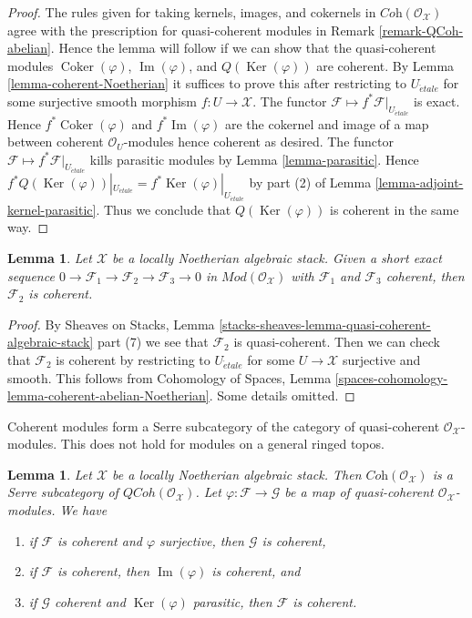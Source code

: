 \documentclass{stacks-project}
\theoremstyle{plain}
\newtheorem{lemma}[subsection]{Lemma}
\theoremstyle{definition}
\theoremstyle{remark}
\numberwithin{equation}{subsection}
\def\etale{{\acute{e}tale}}
\def\QCoh{\mathit{QCoh}}
\def\Ker{\mathop{\mathrm{Ker}}}
\def\Im{\mathop{\mathrm{Im}}}
\def\Coker{\mathop{\mathrm{Coker}}}
\begin{document}
\begin{proof}
The rules given for taking kernels, images, and cokernels in
$\textit{Coh}(\mathcal{O}_\mathcal{X})$ agree with the prescription
for quasi-coherent modules in Remark \ref{remark-QCoh-abelian}.
Hence the lemma will follow if we can show that the quasi-coherent modules
$\Coker(\varphi)$, $\Im(\varphi)$, and $Q(\Ker(\varphi))$ are coherent.
By Lemma \ref{lemma-coherent-Noetherian} it suffices to prove this after
restricting to $U_\etale$ for some surjective smooth morphism
$f : U \to \mathcal{X}$. The functor
$\mathcal{F} \mapsto f^*\mathcal{F}|_{U_\etale}$
is exact. Hence $f^*\Coker(\varphi)$ and $f^*\Im(\varphi)$ are
the cokernel and image of a map between coherent $\mathcal{O}_U$-modules
hence coherent as desired. The functor
$\mathcal{F} \mapsto f^*\mathcal{F}|_{U_\etale}$
kills parasitic modules by Lemma \ref{lemma-parasitic}.
Hence $f^*Q(\Ker(\varphi))|_{U_\etale} = f^*\Ker(\varphi)|_{U_\etale}$
by part (2) of Lemma \ref{lemma-adjoint-kernel-parasitic}.
Thus we conclude that $Q(\Ker(\varphi))$ is coherent in the same way.
\end{proof}

\begin{lemma}
\label{lemma-extension-coherent}
Let $\mathcal{X}$ be a locally Noetherian algebraic stack.
Given a short exact sequence
$0 \to \mathcal{F}_1 \to \mathcal{F}_2 \to \mathcal{F}_3 \to 0$
in $\textit{Mod}(\mathcal{O}_\mathcal{X})$
with $\mathcal{F}_1$ and $\mathcal{F}_3$ coherent, then
$\mathcal{F}_2$ is coherent.
\end{lemma}

\begin{proof}
By Sheaves on Stacks, Lemma
\ref{stacks-sheaves-lemma-quasi-coherent-algebraic-stack} part (7) we see that
$\mathcal{F}_2$ is quasi-coherent. Then we can check that
$\mathcal{F}_2$ is coherent by restricting to $U_\etale$
for some $U \to \mathcal{X}$ surjective and smooth.
This follows from Cohomology of Spaces, Lemma
\ref{spaces-cohomology-lemma-coherent-abelian-Noetherian}.
Some details omitted.
\end{proof}

\noindent
Coherent modules form a Serre subcategory of the
category of quasi-coherent $\mathcal{O}_\mathcal{X}$-modules.
This does not hold for modules on a general ringed topos.

\begin{lemma}
\label{lemma-coherent-Noetherian-quasi-coherent-sub-quotient}
Let $\mathcal{X}$ be a locally Noetherian algebraic stack.
Then $\textit{Coh}(\mathcal{O}_\mathcal{X})$ is a Serre subcategory of
$\QCoh(\mathcal{O}_\mathcal{X})$. Let $\varphi : \mathcal{F} \to \mathcal{G}$
be a map of quasi-coherent $\mathcal{O}_\mathcal{X}$-modules. We have
\begin{enumerate}
\item if $\mathcal{F}$ is coherent and $\varphi$ surjective,
then $\mathcal{G}$ is coherent,
\item if $\mathcal{F}$ is coherent, then $\Im(\varphi)$ is coherent, and
\item if $\mathcal{G}$ coherent and $\Ker(\varphi)$ parasitic, then
$\mathcal{F}$ is coherent.
\end{enumerate}
\end{lemma}
\end{document}
